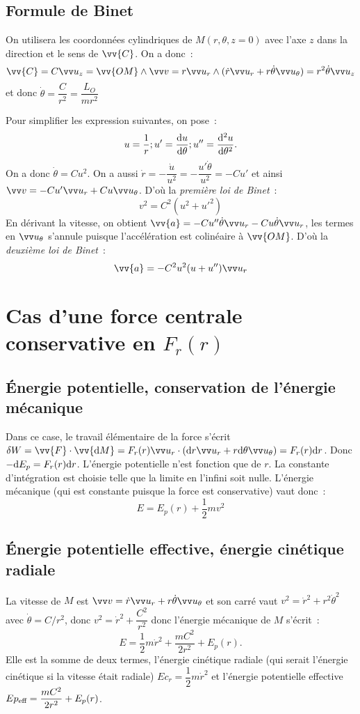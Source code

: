 \subsection{Formule de Binet}%
On utilisera les coordonnées cylindriques de \(M(r, \theta, z=0)\) avec l'axe
\(z\) dans la direction et le sens de \(\vv{C}\). On a donc~:
\[\vv{C} = C \uz = \vv{OM} \wedge \vvv = r \ur \wedge (\dot{r}\ur +
r\dot{\theta} \utheta) = r^2\dot{\theta} \uz\]
et donc \(\dot{\theta} = \dfrac{C}{r^2} = \dfrac{L_O}{mr^2}\)

Pour simplifier les expression suivantes, on pose~:
\[u = \dfrac{1}{r} ; u'=\dfrac{\mathrm{d} u}{\mathrm{d} \theta} ; u''=\dfrac{\mathrm{d}^2 u}{\mathrm{d} {\theta}^2}.\]
On a donc \(\dot{\theta} = Cu^2\). On a aussi \(\dot{r} = -\dfrac{\dot{u}}{u^2}
= -\dfrac{u' \dot{\theta}}{u^2} = -Cu'\) et ainsi \(\vvv = -Cu' \ur + Cu
\utheta\). D'où la \emph{première loi de Binet}~:
\begin{equation}%
  v^2 = C^2(u^2 + u'^2)
\end{equation}%
En dérivant la vitesse, on obtient \(\vv{a} = -Cu''\dot{\theta}\ur
-Cu\dot{\theta}\ur\), les termes en \(\utheta\) s'annule puisque l'accélération
est colinéaire à \(\vv{OM}\). D'où la \emph{deuxième loi de Binet}~:
\begin{equation}%
  \vv{a} = -C^2u^2(u+u'')\ur
\end{equation}%
\section{Cas d'une force centrale conservative en \(F_r(r)\)}%
\subsection{Énergie potentielle, conservation de l'énergie mécanique}%
Dans ce case, le travail élémentaire de la force s'écrit \(\delta{}W =
\vv{F}\cdot\vv{\D{M}} = F_r(r)\ur\cdot(\D{r}\ur + r\D{\theta}\utheta) = %
F_r(r)\D{r}\). Donc \(-\mathrm{d}{E_p} = F_r(r)\mathrm{d}{r}\). L'énergie potentielle n'est
fonction que de \(r\). La constante d'intégration est choisie telle que la
limite en l'infini soit nulle. L'énergie mécanique (qui est constante puisque
la force est conservative) vaut donc~:
\[E = E_p(r) + \dfrac{1}{2} mv^2\]

\subsection{Énergie potentielle effective, énergie cinétique radiale}%
La vitesse de \(M\) est \(\vvv = \dot{r}\ur + r\dot{\theta}\utheta\) et son
carré vaut \(v^2 = \dot{r}^2 + r^2\dot{\theta}^2\) avec \(\dot{\theta} =
C/r^2\), donc \(v^2 = \dot{r}^2 + \dfrac{C^2}{r^2}\) donc l'énergie mécanique
de \(M\) s'écrit~:
\[E = \dfrac{1}{2}m\dot{r}^2 + \dfrac{mC^2}{2r^2} + E_p(r).\]
Elle est la somme de deux termes, l'énergie cinétique radiale (qui serait
l'énergie cinétique si la vitesse était radiale) \(Ec_r =
\dfrac{1}{2}m\dot{r}^2\) et l'énergie potentielle %
effective \(Ep_{\textmd{eff}} = \dfrac{mC^2}{2r^2} + E_p(r)\).

